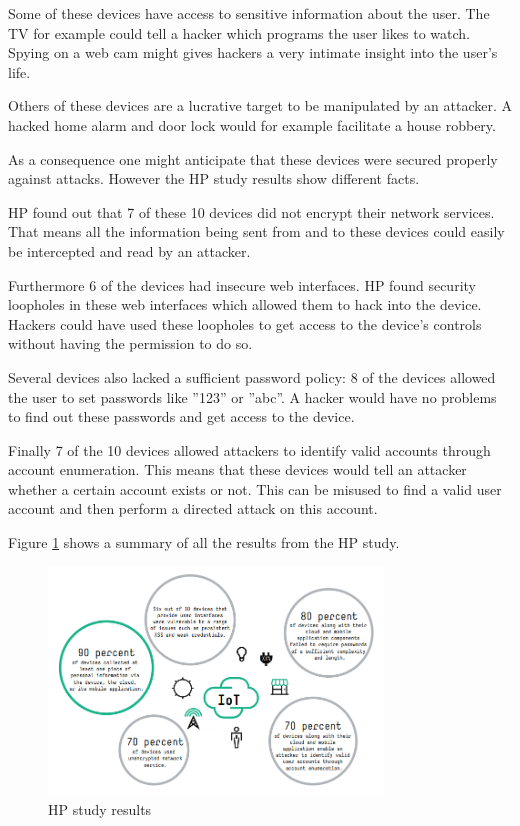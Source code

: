\documentclass[conference]{IEEEtran}
\begin{document}
Some of these devices have access to sensitive information about the user. The 
TV for example could tell a hacker which programs the user likes to watch. 
Spying on a web cam might gives hackers a very intimate insight into the user's 
life.

Others of these devices are a lucrative target to be manipulated by an 
attacker. A hacked home alarm and door lock would for example facilitate a 
house robbery. 

As a consequence one might anticipate that these devices were secured properly 
against attacks. However the HP study results show different facts.

HP found out that 7 of these 10 devices did not encrypt their network services. 
That means all the information being sent from and to these devices could easily
be intercepted and read by an attacker. 

Furthermore 6 of the devices had insecure web interfaces. HP found security 
loopholes in these web interfaces which allowed them to hack into the device. 
Hackers could have used these loopholes to get access to the device's controls 
without having the permission to do so. 

Several devices also lacked a sufficient password policy: 8 of the devices 
allowed the user to set passwords like ''123'' or ''abc''. A hacker would 
have no problems to find out these passwords and get access to the device.

Finally 7 of the 10 devices allowed attackers to identify valid accounts 
through account enumeration. This means that these devices would tell an 
attacker whether a certain account exists or not. This can be misused to find 
a valid user account and then perform a directed attack on this account. 

Figure \ref{HPStudyresults} shows a summary of all the results from the HP 
study.

\begin{figure}[!t]
\centering
\includegraphics[width=3.5in]{./img/hpStudy1.png}
\caption{HP study results}
\label{HPStudyresults}
\end{figure}
\end{document}
